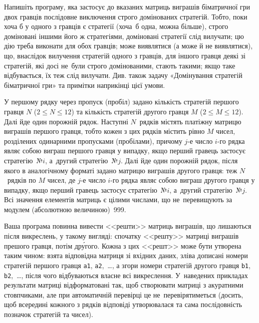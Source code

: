 ﻿Напишіть програму, яка застосує до вказаних матриць виграшів біматричної гри двох гравців послідовне виключення строго домінованих стратегій. Тобто, поки хоча б у одного з гравців є стратегії (хоча~б одна, можна більше), строго доміновані іншими його ж стратегіями, доміновані стратегії слід вилучати; цю дію треба виконати для обох гравців; може виявлятися (а може й не виявлятися), що, внаслідок вилучення стратегій одного з гравців, для іншого гравця деякі зі стратегій, які досі не~були строго домінованими, стають такими; якщо таке відбувається, їх теж слід вилучати. Див. також задачу «Домінування стратегій біматричної гри» та примітки наприкінці цієї умови.

\InputFile
У першому рядку через пропуск (пробіл) задано кількість стратегій першого гравця $N$ ($2{{\leqslant}}N{{\leqslant}}12$) та кількість стратегій другого гравця $M$ ($2{{\leqslant}}M{{\leqslant}}12$).
Далі йде один порожній рядок.
Наступні $N$~рядків містять платіжну матрицю виграшів першого гравця, тобто кожен з цих рядків містить рівно $M$ чисел, розділених одинарними пропусками (пробілами), причому {$j$-е} число {$i$-го} рядка являє собою виграш першого гравця у випадку, якщо перший гравець застосує стратегію~№$i$, а~другий стратегію~№$j$. Далі йде один порожній рядок, після якого в аналогічному форматі задано матрицю виграшів другого гравця: теж $N$~рядків по $M$ чисел, де {$j$-е} число {$i$-го} рядка являє собою виграш другого гравця у випадку, якщо перший гравець застосує стратегію~№$i$, а~другий стратегію~№$j$. Всі значення елементів матриць є цілими числами, що не~перевищують за модулем (абсолютною величиною)~999.

\OutputFile
Ваша програма повинна вивести <<решти>> матриць виграшів, що лишаються після викреслень, у такому вигляді: спочатку <<решту>> матриці виграшів прешого гравця, потім др\'{у}гого. Кожна з цих <<решт>> може бути утворена таким чином: взята відповідна матриця зі вхідних даних, зліва дописані номери стратегій першого гравця \texttt{a1}, \texttt{a2},~\dots, а згори номери стратегій другого гравця \texttt{b1}, \texttt{b2},~\dots, після чого відбуваються власне всі викреслення.
У~наведених прикладах результати матриці відформатовані так, щоб створювати матриці з акуратними стовпчиками, але при автоматичній перевірці це не~перевірятиметься (досить, щоб всередині кожного з рядків відповіді утворювалася та сама послідовність позначок стратегій та чисел).

\Examples

\begin{example}
%
\end{example}

